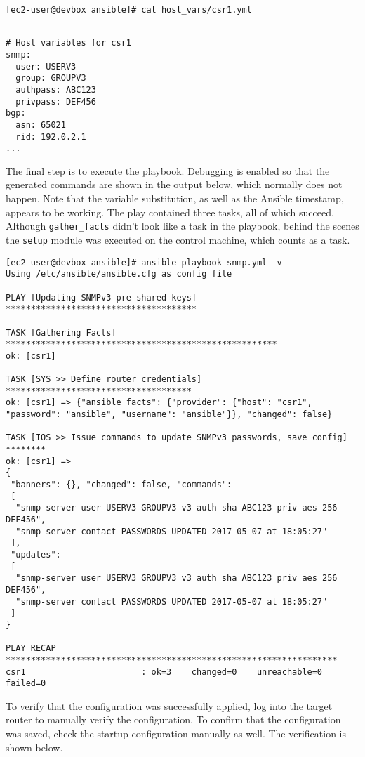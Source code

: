 \begin{verbatim}
[ec2-user@devbox ansible]# cat host_vars/csr1.yml
\end{verbatim}

\begin{verbatim}
---
# Host variables for csr1
snmp:
  user: USERV3
  group: GROUPV3
  authpass: ABC123
  privpass: DEF456
bgp:
  asn: 65021  
  rid: 192.0.2.1
...
\end{verbatim}

The final step is to execute the playbook. Debugging is enabled so that the
generated commands are shown in the output below, which normally does not
happen. Note that the variable substitution, as well as the Ansible timestamp,
appears to be working. The play contained three tasks, all of which succeed.
Although \verb|gather_facts| didn't look like a task in the playbook, behind the
scenes the \verb|setup| module was executed on the control machine, which
counts as a task.

\begin{verbatim}
[ec2-user@devbox ansible]# ansible-playbook snmp.yml -v
Using /etc/ansible/ansible.cfg as config file

PLAY [Updating SNMPv3 pre-shared keys] **************************************

TASK [Gathering Facts] ******************************************************
ok: [csr1]

TASK [SYS >> Define router credentials] *************************************
ok: [csr1] => {"ansible_facts": {"provider": {"host": "csr1",
"password": "ansible", "username": "ansible"}}, "changed": false}

TASK [IOS >> Issue commands to update SNMPv3 passwords, save config] ********
ok: [csr1] =>
{
 "banners": {}, "changed": false, "commands":
 [
  "snmp-server user USERV3 GROUPV3 v3 auth sha ABC123 priv aes 256 DEF456",
  "snmp-server contact PASSWORDS UPDATED 2017-05-07 at 18:05:27"
 ],
 "updates":
 [
  "snmp-server user USERV3 GROUPV3 v3 auth sha ABC123 priv aes 256 DEF456",
  "snmp-server contact PASSWORDS UPDATED 2017-05-07 at 18:05:27"
 ]
}

PLAY RECAP ******************************************************************
csr1                       : ok=3    changed=0    unreachable=0    failed=0
\end{verbatim}

To verify that the configuration was successfully applied, log into the target
router to manually verify the configuration. To confirm that the configuration
was saved, check the startup-configuration manually as well. The verification
is shown below.

